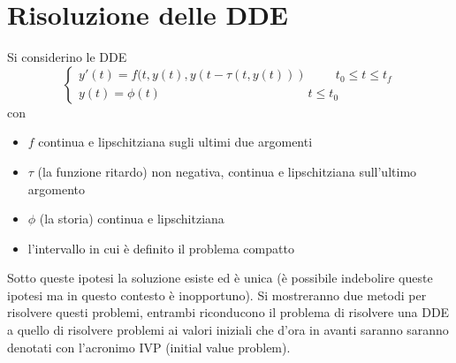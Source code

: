
\chapter{Risoluzione delle DDE}
\vspace{1cm}
Si considerino le DDE 
$$
\begin{cases}
 y'(t) = f(t,y(t),y(t- \tau (t,y(t)))	\hspace{1cm}	t_0 \le t \le t_f \\
 y(t)=\phi(t)				\hspace{5cm}	t \le t_0
\end{cases}
$$
con
\begin{itemize}
 \item $f$ continua e lipschitziana sugli ultimi due argomenti
 \item $\tau$ (la funzione ritardo) non negativa, continua e lipschitziana sull'ultimo argomento
 \item $\phi$ (la storia) continua e lipschitziana
 \item l'intervallo in cui è definito il problema compatto
\end{itemize}

Sotto queste ipotesi la soluzione esiste ed è unica (è possibile 
indebolire queste ipotesi ma in questo contesto è inopportuno).
Si mostreranno due metodi per risolvere questi problemi, entrambi riconducono il problema 
di risolvere una DDE a quello di risolvere problemi ai valori iniziali che d'ora in avanti 
saranno saranno denotati con l'acronimo IVP (initial value problem).



